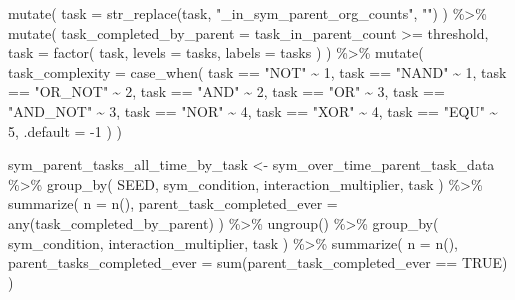 \documentclass[
]{book}
\newenvironment{Shaded}{\begin{snugshade}}{\end{snugshade}}
\newcommand{\AttributeTok}[1]{\textcolor[rgb]{0.77,0.63,0.00}{#1}}
\newcommand{\ConstantTok}[1]{\textcolor[rgb]{0.00,0.00,0.00}{#1}}
\newcommand{\DecValTok}[1]{\textcolor[rgb]{0.00,0.00,0.81}{#1}}
\newcommand{\FunctionTok}[1]{\textcolor[rgb]{0.00,0.00,0.00}{#1}}
\newcommand{\NormalTok}[1]{#1}
\newcommand{\OtherTok}[1]{\textcolor[rgb]{0.56,0.35,0.01}{#1}}
\newcommand{\SpecialCharTok}[1]{\textcolor[rgb]{0.00,0.00,0.00}{#1}}
\newcommand{\StringTok}[1]{\textcolor[rgb]{0.31,0.60,0.02}{#1}}
\begin{document}
\begin{Shaded}
\begin{Highlighting}[]
  \FunctionTok{mutate}\NormalTok{(}
    \AttributeTok{task =} \FunctionTok{str\_replace}\NormalTok{(task, }\StringTok{"\_in\_sym\_parent\_org\_counts"}\NormalTok{, }\StringTok{""}\NormalTok{)}
\NormalTok{  ) }\SpecialCharTok{\%\textgreater{}\%}
  \FunctionTok{mutate}\NormalTok{(}
    \AttributeTok{task\_completed\_by\_parent =}\NormalTok{ task\_in\_parent\_count }\SpecialCharTok{\textgreater{}=}\NormalTok{ threshold,}
    \AttributeTok{task =} \FunctionTok{factor}\NormalTok{(}
\NormalTok{      task,}
      \AttributeTok{levels =}\NormalTok{ tasks,}
      \AttributeTok{labels =}\NormalTok{ tasks}
\NormalTok{    )}
\NormalTok{  ) }\SpecialCharTok{\%\textgreater{}\%}
  \FunctionTok{mutate}\NormalTok{(}
    \AttributeTok{task\_complexity =} \FunctionTok{case\_when}\NormalTok{(}
\NormalTok{      task }\SpecialCharTok{==} \StringTok{"NOT"} \SpecialCharTok{\textasciitilde{}} \DecValTok{1}\NormalTok{,}
\NormalTok{      task }\SpecialCharTok{==} \StringTok{"NAND"} \SpecialCharTok{\textasciitilde{}} \DecValTok{1}\NormalTok{,}
\NormalTok{      task }\SpecialCharTok{==} \StringTok{"OR\_NOT"} \SpecialCharTok{\textasciitilde{}} \DecValTok{2}\NormalTok{,}
\NormalTok{      task }\SpecialCharTok{==} \StringTok{"AND"} \SpecialCharTok{\textasciitilde{}} \DecValTok{2}\NormalTok{,}
\NormalTok{      task }\SpecialCharTok{==} \StringTok{"OR"} \SpecialCharTok{\textasciitilde{}} \DecValTok{3}\NormalTok{,}
\NormalTok{      task }\SpecialCharTok{==} \StringTok{"AND\_NOT"} \SpecialCharTok{\textasciitilde{}} \DecValTok{3}\NormalTok{,}
\NormalTok{      task }\SpecialCharTok{==} \StringTok{"NOR"} \SpecialCharTok{\textasciitilde{}} \DecValTok{4}\NormalTok{,}
\NormalTok{      task }\SpecialCharTok{==} \StringTok{"XOR"} \SpecialCharTok{\textasciitilde{}} \DecValTok{4}\NormalTok{,}
\NormalTok{      task }\SpecialCharTok{==} \StringTok{"EQU"} \SpecialCharTok{\textasciitilde{}} \DecValTok{5}\NormalTok{,}
      \AttributeTok{.default =} \SpecialCharTok{{-}}\DecValTok{1}
\NormalTok{    )}
\NormalTok{  )}

\NormalTok{sym\_parent\_tasks\_all\_time\_by\_task }\OtherTok{\textless{}{-}}\NormalTok{ sym\_over\_time\_parent\_task\_data }\SpecialCharTok{\%\textgreater{}\%}
  \FunctionTok{group\_by}\NormalTok{(}
\NormalTok{    SEED,}
\NormalTok{    sym\_condition,}
\NormalTok{    interaction\_multiplier,}
\NormalTok{    task}
\NormalTok{  ) }\SpecialCharTok{\%\textgreater{}\%}
  \FunctionTok{summarize}\NormalTok{(}
    \AttributeTok{n =} \FunctionTok{n}\NormalTok{(),}
    \AttributeTok{parent\_task\_completed\_ever =} \FunctionTok{any}\NormalTok{(task\_completed\_by\_parent)}
\NormalTok{  ) }\SpecialCharTok{\%\textgreater{}\%}
  \FunctionTok{ungroup}\NormalTok{() }\SpecialCharTok{\%\textgreater{}\%}
  \FunctionTok{group\_by}\NormalTok{(}
\NormalTok{    sym\_condition,}
\NormalTok{    interaction\_multiplier,}
\NormalTok{    task}
\NormalTok{  ) }\SpecialCharTok{\%\textgreater{}\%}
  \FunctionTok{summarize}\NormalTok{(}
    \AttributeTok{n =} \FunctionTok{n}\NormalTok{(),}
    \AttributeTok{parent\_tasks\_completed\_ever =} \FunctionTok{sum}\NormalTok{(parent\_task\_completed\_ever }\SpecialCharTok{==} \ConstantTok{TRUE}\NormalTok{)}
\NormalTok{  )}
\end{Highlighting}
\end{Shaded}
\end{document}
